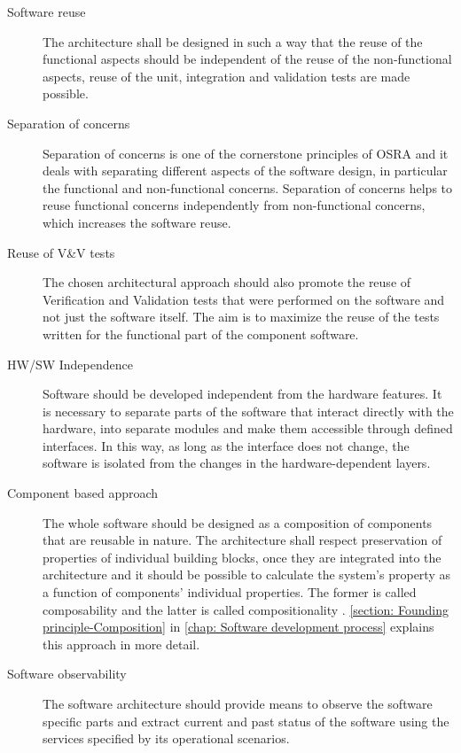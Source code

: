 \begin{description}
\item [Software reuse] The architecture shall be designed in such a way that the reuse of the functional aspects should be independent of the reuse of the non-functional aspects, reuse of the unit, integration and validation tests are made possible.
 
\item [Separation of concerns] Separation of concerns is one of the cornerstone principles of OSRA and it deals with separating different aspects of the software design, in particular the functional and non-functional concerns. Separation of concerns helps to reuse functional concerns independently from non-functional concerns, which increases the software reuse.
 
\item [Reuse of V\&V tests] The chosen architectural approach should also promote the reuse of Verification and Validation tests that were performed on the software and not just the software itself. The aim is to maximize the reuse of the tests written for the functional part of the component software.

\item [HW/SW Independence] Software should be developed independent from the hardware features. It is necessary to separate parts of the software that interact directly with the hardware, into separate modules and make them accessible through defined interfaces. In this way, as long as the interface does not change, the software is isolated from the changes in the hardware-dependent layers.
	  	
\item [Component based approach] The whole software should be designed as a composition of components that are reusable in nature. The architecture shall respect preservation of properties of individual building blocks, once they are integrated into the architecture and it should be possible to calculate the system's property as a function of components' individual properties. The former is called composability and the latter is called compositionality \cite{CompBasedDev}. \cref{section: Founding principle-Composition} in \cref{chap: Software development process} explains this approach in more detail.
  
\item [Software observability] The software architecture should provide means to observe the software specific parts and extract current and past status of the software using the services specified by its operational scenarios.


\end{description}
